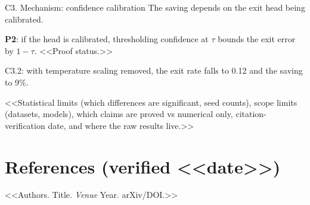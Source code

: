 \documentclass[10pt]{article}
\begin{document}
\begin{claimbox}{C3. Mechanism: confidence calibration}
The saving depends on the exit head being calibrated.
\end{claimbox}
\begin{thbox}
\textbf{P2}: if the head is calibrated, thresholding confidence at $\tau$ bounds the exit error by $1-\tau$. <<Proof status.>>
\end{thbox}
\begin{nubox}
C3.2: with temperature scaling removed, the exit rate falls to 0.12 and the saving to 9\%.
\end{nubox}

\begin{cabox}
<<Statistical limits (which differences are significant, seed counts), scope limits (datasets, models), which claims are
proved vs numerical only, citation-verification date, and where the raw results live.>>
\end{cabox}

\section*{References (verified <<date>>)}
{\small
\begin{enumerate}[label={[\arabic*]},leftmargin=2.2em]
\item <<Authors. Title. \emph{Venue} Year. arXiv/DOI.>>
\end{enumerate}}
\end{document}
